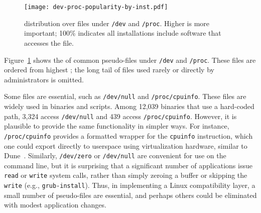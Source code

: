 
\begin{figure}[t]
\centering
\texttt{[image: dev-proc-popularity-by-inst.pdf]}
\caption{\usagemetric{} distribution over files under {\tt /dev} and {\tt /proc}.  Higher is more important; 100\% indicates all installations include software that accesses the file. }
\label{fig:syspop:dev-proc-popularity}
\end{figure}

Figure~\ref{fig:syspop:dev-proc-popularity} shows the \usagemetric{} of common pseudo-files under {\tt/dev} and {\tt /proc}.  
These files are ordered from highest \usagemetric{}; the long tail
of files used rarely or directly by administrators is omitted.

Some files %
are essential,
such as {\tt /dev/null} and {\tt /proc\-/\-cpuinfo}.
These files are widely used in %
binaries and scripts.
Among 12,039 binaries that use a hard-coded path,
3,324 access {\tt /dev/null} and 439 access {\tt /proc/cpuinfo}.
However, it is plausible to provide the same functionality in
simpler ways.
For instance, {\tt /proc/cpuinfo} provides a formatted wrapper for
the {\tt cpuinfo} instruction, which one could export
directly to userspace using virtualization hardware, similar to Dune~\citep{belay12dune}.
Similarly, {\tt /dev/zero} or {\tt /dev/null} are convenient for use on the command
line, but it is surprising that a significant number of applications
issue {\tt read} or {\tt write} system calls, rather than simply zeroing a buffer
or skipping the {\tt write}
(e.g., {\tt grub-install}).
Thus, in implementing a Linux compatibility layer, a small number of pseudo-files
are essential, and perhaps others could be eliminated with modest application changes.



